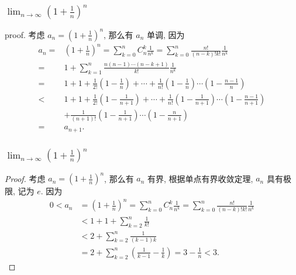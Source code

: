 \documentclass[
10pt,  
aspectratio=43,  
]{beamer}
\begin{document}
\begin{frame}
	\frametitle{$\lim_{n\to\infty}\left(1+\frac1n\right)^n$}
	\begin{block}{proof.}
		考虑 $a_n=\left(1+\frac{1}{n}\right)^n$, 那么有 $a_n$ 单调, 因为
		\begin{equation*}
			\begin{aligned}
			a_n= & \left(1+\frac{1}{n}\right)^n=\sum_{k=0}^n C_n^k \frac{1}{n^k}=\sum_{k=0}^n \frac{n!}{(n-k)!k!} \frac{1}{n^k} \\
			= & 1+\sum_{k=1}^n \frac{n(n-1) \cdots(n-k+1)}{k !} \frac{1}{n^k} \\
			= & 1+1+\frac{1}{2 !}\left(1-\frac{1}{n}\right)+\cdots+\frac{1}{n !}\left(1-\frac{1}{n}\right) \cdots\left(1-\frac{n-1}{n}\right) \\
			< & 1+1+\frac{1}{2 !}\left(1-\frac{1}{n+1}\right)+\cdots+\frac{1}{n !}\left(1-\frac{1}{n+1}\right) \cdots\left(1-\frac{n-1}{n+1}\right) \\
			& +\frac{1}{(n+1) !}\left(1-\frac{1}{n+1}\right) \cdots\left(1-\frac{n}{n+1}\right) \\
			= & a_{n+1}.
			\end{aligned}
			\end{equation*}
	\end{block}
\end{frame}

\begin{frame}
	\frametitle{$\lim_{n\to\infty}\left(1+\frac1n\right)^n$}
	\begin{proof}
		考虑 $a_n=\left(1+\frac{1}{n}\right)^n$, 那么有 $a_n$ 有界, 根据单点有界收敛定理, $a_n$ 具有极限, 记为 $e$. 因为
		\begin{equation*}
			\begin{aligned}
			0<a_n & =  \left(1+\frac{1}{n}\right)^n=\sum_{k=0}^n C_n^k \frac{1}{n^k}=\sum_{k=0}^n \frac{n!}{(n-k)!k!} \frac{1}{n^k} \\
			&<1+1+\sum_{k=2}^n \frac{1}{k !} \\
			& <2+\sum_{k=2}^n \frac{1}{(k-1) k} \\
			& =2+\sum_{k=2}^n\left(\frac{1}{k-1}-\frac{1}{k}\right)=3-\frac{1}{n}<3 .
			\end{aligned}
			\end{equation*}
	\end{proof}
\end{frame}
\end{document}
